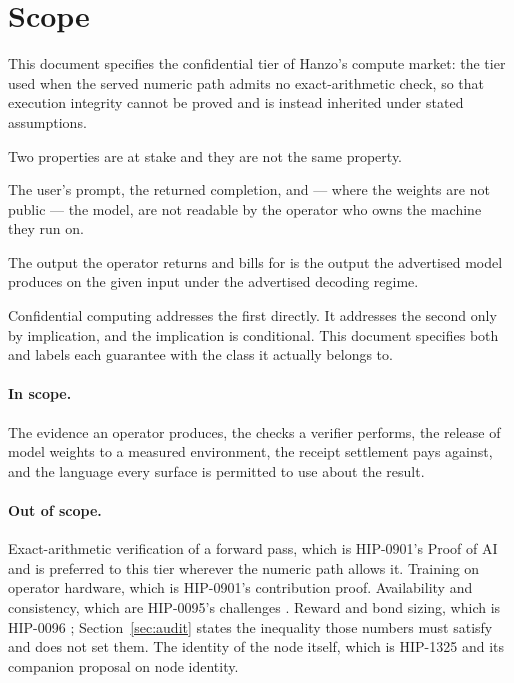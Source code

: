 \documentclass[11pt,a4paper]{article}
\begin{document}
\tableofcontents

\section{Scope}
\label{sec:scope}

This document specifies the confidential tier of Hanzo's compute market: the tier
used when the served numeric path admits no exact-arithmetic check, so that
execution integrity cannot be proved and is instead inherited under stated
assumptions.

Two properties are at stake and they are not the same property.

\begin{description}[leftmargin=1.4em]
\item[Confidentiality.] The user's prompt, the returned completion, and --- where
the weights are not public --- the model, are not readable by the operator who
owns the machine they run on.
\item[Execution integrity.] The output the operator returns and bills for is the
output the advertised model produces on the given input under the advertised
decoding regime.
\end{description}

Confidential computing addresses the first directly. It addresses the second only
by implication, and the implication is conditional. This document specifies both
and labels each guarantee with the class it actually belongs to.

\paragraph{In scope.} The evidence an operator produces, the checks a verifier
performs, the release of model weights to a measured environment, the receipt
settlement pays against, and the language every surface is permitted to use about
the result.

\paragraph{Out of scope.} Exact-arithmetic verification of a forward pass, which
is HIP-0901's Proof of AI \cite{hip0901} and is preferred to this tier wherever the
numeric path allows it. Training on operator hardware, which is HIP-0901's
contribution proof. Availability and consistency, which are HIP-0095's challenges
\cite{hip0095}. Reward and bond sizing, which is HIP-0096 \cite{hip0096};
Section~\ref{sec:audit} states the inequality those numbers must satisfy and does
not set them. The identity of the node itself, which is HIP-1325 \cite{hip1325}
and its companion proposal on node identity.
\end{document}
